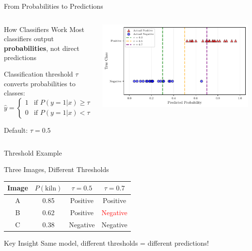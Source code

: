\documentclass{beamer}
\begin{document}
\begin{frame}{From Probabilities to Predictions}
\begin{columns}
\begin{column}{0.48\textwidth}
\begin{definitionbox}{How Classifiers Work}
\small
Most classifiers output \textbf{probabilities}, not direct predictions

\vspace{0.15cm}

Classification threshold $\tau$ converts probabilities to classes:
$$\hat{y} = \begin{cases}
1 & \text{if } P(y=1|x) \geq \tau \\
0 & \text{if } P(y=1|x) < \tau
\end{cases}$$

Default: $\tau = 0.5$
\end{definitionbox}
\end{column}
\begin{column}{0.48\textwidth}
\includegraphics[width=\textwidth]{threshold-effect-diagram.pdf}
\end{column}
\end{columns}
\end{frame}

\begin{frame}{Threshold Example}
\begin{examplebox}{Three Images, Different Thresholds}
\small
\begin{center}
\begin{tabular}{|c|c|c|c|}
\hline
Image & $P(\text{kiln})$ & $\tau=0.5$ & $\tau=0.7$ \\
\hline
A & 0.85 & Positive & Positive \\
B & 0.62 & Positive & \textcolor{red}{Negative} \\
C & 0.38 & Negative & Negative \\
\hline
\end{tabular}
\end{center}
\end{examplebox}

\vspace{0.15cm}

\begin{keypointsbox}{Key Insight}
\small
Same model, different thresholds = different predictions!
\end{keypointsbox}
\end{frame}
\end{document}
